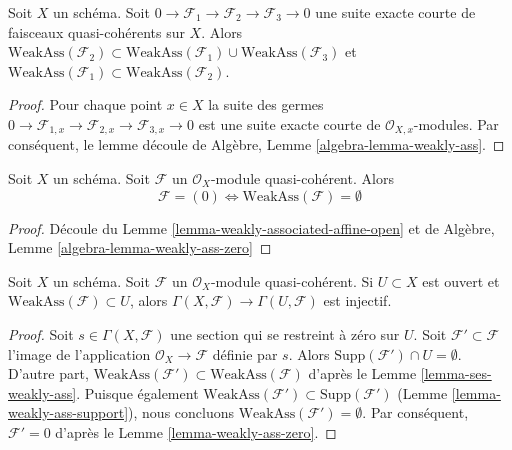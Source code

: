 \begin{lemma}
\label{lemma-ses-weakly-ass}
Soit  $X$  un schéma. Soit  $0 \to \mathcal{F}_1 \to \mathcal{F}_2 \to \mathcal{F}_3 \to 0$  une suite exacte courte de
faisceaux quasi-cohérents sur  $X$. Alors  $\text{WeakAss}(\mathcal{F}_2) \subset
\text{WeakAss}(\mathcal{F}_1) \cup \text{WeakAss}(\mathcal{F}_3)$  et  $\text{WeakAss}(\mathcal{F}_1) \subset \text{WeakAss}(\mathcal{F}_2)$.
\end{lemma}

\begin{proof}
Pour chaque point  $x \in X$  la suite des germes  $0 \to \mathcal{F}_{1, x} \to \mathcal{F}_{2, x} \to \mathcal{F}_{3, x} \to 0$  est une suite
exacte courte de  $\mathcal{O}_{X, x}$-modules. Par conséquent, le lemme découle de
Algèbre, Lemme  \ref{algebra-lemma-weakly-ass}.
\end{proof}

\begin{lemma}
\label{lemma-weakly-ass-zero}
Soit  $X$  un schéma. Soit  $\mathcal{F}$  un  $\mathcal{O}_X$-module
quasi-cohérent. Alors
$$
\mathcal{F} = (0) \Leftrightarrow \text{WeakAss}(\mathcal{F}) = \emptyset
$$
\end{lemma}

\begin{proof}
Découle du Lemme  \ref{lemma-weakly-associated-affine-open}  et de Algèbre, Lemme  \ref{algebra-lemma-weakly-ass-zero}
\end{proof}

\begin{lemma}
\label{lemma-restriction-injective-open-contains-weakly-ass}
Soit  $X$  un schéma. Soit  $\mathcal{F}$  un  $\mathcal{O}_X$-module
quasi-cohérent. Si  $U \subset X$  est ouvert et  $\text{WeakAss}(\mathcal{F}) \subset U$, alors  $\Gamma(X, \mathcal{F}) \to \Gamma(U, \mathcal{F})$  est
injectif.
\end{lemma}

\begin{proof}
Soit  $s \in \Gamma(X, \mathcal{F})$  une section qui se restreint à zéro sur  $U$. Soit
 $\mathcal{F}' \subset \mathcal{F}$  l'image de l'application  $\mathcal{O}_X \to \mathcal{F}$  définie par  $s$. Alors
 $\text{Supp}(\mathcal{F}') \cap U = \emptyset$. D'autre part,  $\text{WeakAss}(\mathcal{F}') \subset \text{WeakAss}(\mathcal{F})$  d'après le Lemme  \ref{lemma-ses-weakly-ass}. Puisque
également  $\text{WeakAss}(\mathcal{F}') \subset \text{Supp}(\mathcal{F}')$  (Lemme  \ref{lemma-weakly-ass-support}), nous concluons  $\text{WeakAss}(\mathcal{F}') = \emptyset$. Par
conséquent,  $\mathcal{F}' = 0$  d'après le Lemme  \ref{lemma-weakly-ass-zero}.
\end{proof}

